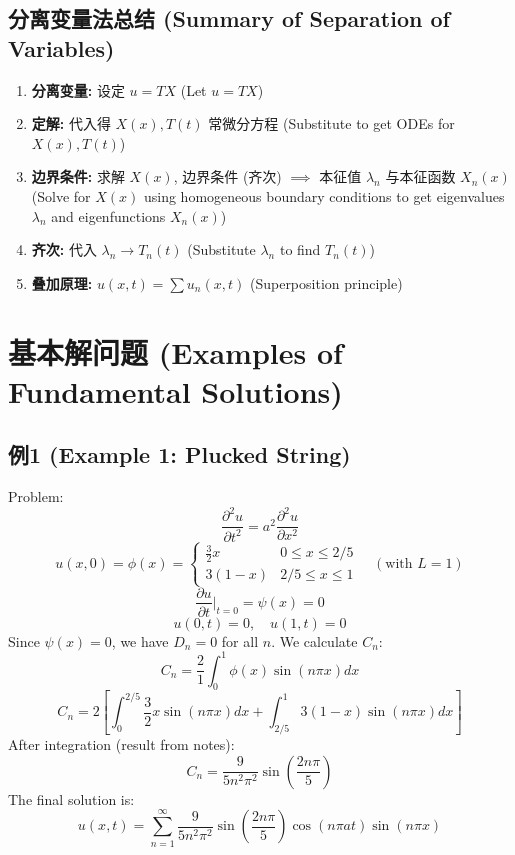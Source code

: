\documentclass{article}
\begin{document}
	\subsection*{分离变量法总结 (Summary of Separation of Variables)}
	\begin{enumerate}
		\item \textbf{分离变量:} 设定 $u=TX$ (Let $u=TX$)
		\item \textbf{定解:} 代入得 $X(x), T(t)$ 常微分方程 (Substitute to get ODEs for $X(x), T(t)$)
		\item \textbf{边界条件:} 求解 $X(x)$, 边界条件 (齐次) $\implies$ 本征值 $\lambda_n$ 与本征函数 $X_n(x)$ (Solve for $X(x)$ using homogeneous boundary conditions to get eigenvalues $\lambda_n$ and eigenfunctions $X_n(x)$)
		\item \textbf{齐次:} 代入 $\lambda_n \to T_n(t)$ (Substitute $\lambda_n$ to find $T_n(t)$)
		\item \textbf{叠加原理:} $u(x,t) = \sum u_n(x,t)$ (Superposition principle)
	\end{enumerate}
	
	\section*{基本解问题 (Examples of Fundamental Solutions)}
	\subsection*{例1 (Example 1: Plucked String)}
	Problem:
	$$ \frac{\partial^2 u}{\partial t^2} = a^2 \frac{\partial^2 u}{\partial x^2} $$
	$$ u(x,0) = \phi(x) = \begin{cases} \frac{3}{2}x & 0 \le x \le 2/5 \\ 3(1-x) & 2/5 \le x \le 1 \end{cases} \quad (\text{with } L=1) $$
	$$ \frac{\partial u}{\partial t}\bigg|_{t=0} = \psi(x) = 0 $$
	$$ u(0,t) = 0, \quad u(1,t) = 0 $$
	Since $\psi(x)=0$, we have $D_n=0$ for all $n$.
	We calculate $C_n$:
	$$ C_n = \frac{2}{1} \int_0^1 \phi(x) \sin(n\pi x) dx $$
	$$ C_n = 2 \left[ \int_0^{2/5} \frac{3}{2}x \sin(n\pi x) dx + \int_{2/5}^1 3(1-x) \sin(n\pi x) dx \right] $$
	After integration (result from notes):
	$$ C_n = \frac{9}{5n^2\pi^2} \sin\left(\frac{2n\pi}{5}\right) $$
	The final solution is:
	$$ u(x,t) = \sum_{n=1}^{\infty} \frac{9}{5n^2\pi^2} \sin\left(\frac{2n\pi}{5}\right) \cos(n\pi at) \sin(n\pi x) $$
	
\end{document}
